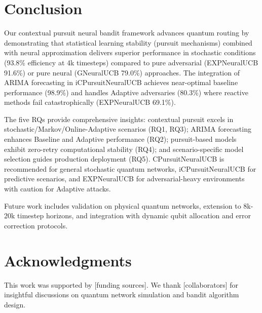 \documentclass[sigconf,anonymous,review,natbib=false]{acmart}
\begin{document}
\section{Conclusion}
\label{sec: Conclusion}

Our contextual pursuit neural bandit framework advances quantum routing by demonstrating that statistical learning stability (pursuit mechanisms) combined with neural approximation delivers superior performance in stochastic conditions (93.8\% efficiency at 4k timesteps) compared to pure adversarial (EXPNeuralUCB 91.6\%) or pure neural (GNeuralUCB 79.0\%) approaches. The integration of ARIMA forecasting in iCPursuitNeuralUCB achieves near-optimal baseline performance (98.9\%) and handles Adaptive adversaries (80.3\%) where reactive methods fail catastrophically (EXPNeuralUCB 69.1\%).

The five RQs provide comprehensive insights: contextual pursuit excels in stochastic/Markov/Online-Adaptive scenarios (RQ1, RQ3); ARIMA forecasting enhances Baseline and Adaptive performance (RQ2); pursuit-based models exhibit zero-retry computational stability (RQ4); and scenario-specific model selection guides production deployment (RQ5). CPursuitNeuralUCB is recommended for general stochastic quantum networks, iCPursuitNeuralUCB for predictive scenarios, and EXPNeuralUCB for adversarial-heavy environments with caution for Adaptive attacks.

Future work includes validation on physical quantum networks, extension to 8k-20k timestep horizons, and integration with dynamic qubit allocation and error correction protocols.


\section*{Acknowledgments}

This work was supported by [funding sources]. We thank [collaborators] for insightful discussions on quantum network simulation and bandit algorithm design.

\clearpage
\balance


\end{document}
